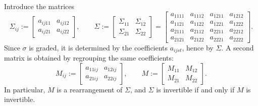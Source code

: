 \documentclass{amsart}
\theoremstyle{definition}
\theoremstyle{remark}
\numberwithin{equation}{section}
\begin{document}
Introduce the matrices
\begin{equation}\label{ZhangZhang2009(E3.0.2)}
\Sigma_{ij}:=\begin{bmatrix}a_{ij11}&a_{ij12}\\ a_{ij21}&a_{ij22}\end{bmatrix},
\qquad
\Sigma:=\begin{bmatrix}\Sigma_{11}&\Sigma_{12}\\ \Sigma_{21}&\Sigma_{22}\end{bmatrix}
=\begin{bmatrix} 
    a_{1111} & a_{1112} & a_{1211} & a_{1212} \\
    a_{1121} & a_{1122} & a_{1221} & a_{1222} \\
    a_{2111} & a_{2112} & a_{2211} & a_{2212} \\
    a_{2121} & a_{2122} & a_{2221} & a_{2222}
\end{bmatrix}.
\end{equation}
Since $\sigma$ is graded, it is determined by the coefficients $a_{ijst}$, hence by $\Sigma$. A second matrix is obtained by regrouping the same coefficients:
\begin{equation}\label{ZhangZhang2009(E3.0.2)'}
M_{ij}:=\begin{bmatrix}a_{11ij}&a_{12ij}\\ a_{21ij}&a_{22ij}\end{bmatrix},
\qquad
M:=\begin{bmatrix}M_{11}&M_{12}\\ M_{21}&M_{22}\end{bmatrix}.
\end{equation}
In particular, $M$ is a rearrangement of $\Sigma$, and $\Sigma$ is invertible if and only if $M$ is invertible.
\end{document}
